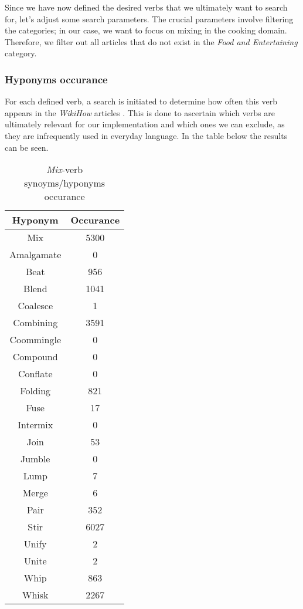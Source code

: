     Since we have now defined the desired verbs that we ultimately want to search for, let's adjust some search parameters. The crucial parameters involve filtering the categories; in our case, we want to focus on mixing in the cooking domain. Therefore, we filter out all articles that do not exist in the \textit{Food and Entertaining} category.
    \subsubsection{Hyponyms occurance}
    For each defined verb, a search is initiated to determine how often this verb appears in the \textit{WikiHow} articles \cite{wikihow}. This is done to ascertain which verbs are ultimately relevant for our implementation and which ones we can exclude, as they are infrequently used in everyday language.
    In the table below the results can be seen.
    \begin{table}[H]
        \centering
        \begin{tabular}{|c|c|}
          \hline
          \textbf{Hyponym} & \textbf{Occurance}  \\
          \hline
          Mix & 5300 \\
          \hline
          Amalgamate & 0 \\
          \hline
          Beat & 956 \\
          \hline
          Blend & 1041 \\
          \hline
          Coalesce & 1 \\
          \hline
          Combining & 3591  \\
          \hline
          Coommingle & 0 \\
          \hline
          Compound & 0 \\
          \hline
          Conflate & 0 \\
          \hline
          Folding & 821 \\
          \hline
          Fuse & 17 \\
          \hline
          Intermix & 0 \\
          \hline
          Join & 53 \\
          \hline
          Jumble & 0 \\
          \hline
          Lump & 7 \\
          \hline
          Merge & 6 \\
          \hline
          Pair & 352 \\
          \hline
          Stir & 6027 \\
          \hline
          Unify & 2 \\
          \hline
          Unite & 2 \\
          \hline
          Whip & 863 \\
          \hline
          Whisk & 2267 \\
          \hline
          
    
        \end{tabular}
        \caption{\textit{Mix}-verb synoyms/hyponyms occurance}
        \label{tab:hyponyms}
      \end{table}
      
